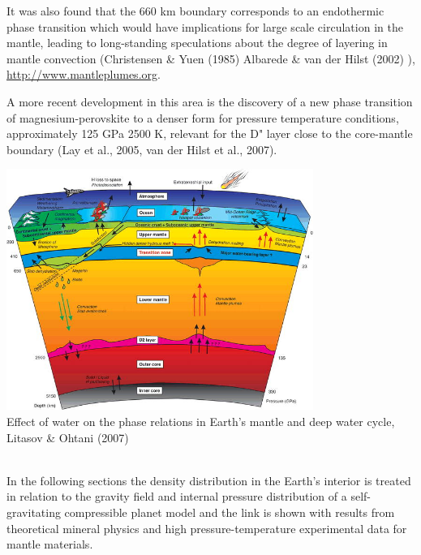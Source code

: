 It was also found that the 660 km boundary corresponds to an
endothermic phase transition which would have implications for 
large scale circulation in the mantle, leading to long-standing 
speculations about the degree of layering in mantle convection
(Christensen \& Yuen (1985) \cite{chyu85}
Albarede \& van der Hilst (2002) \cite{alva02}), \url{http://www.mantleplumes.org}.

A more recent development in this area is the discovery of a new phase
transition of magnesium-perovskite to a denser form for pressure
temperature conditions, approximately 125 GPa 2500 K, relevant for the D"
layer close to the core-mantle boundary
(Lay et al., 2005, van der Hilst et al., 2007).

\begin{center}
\includegraphics[width=10cm]{images/gravity/effect}\\
{\captionfont Effect of water on the phase relations in Earth's mantle and deep water cycle,\\
Litasov \& Ohtani (2007) \cite{lioh07}} 
\end{center}


~\\
In the following sections the density distribution in the
Earth's interior is treated in relation to the gravity field
and internal pressure distribution of a self-gravitating compressible
planet model and the link is shown with results from theoretical
mineral physics and high pressure-temperature experimental data for
mantle materials.
